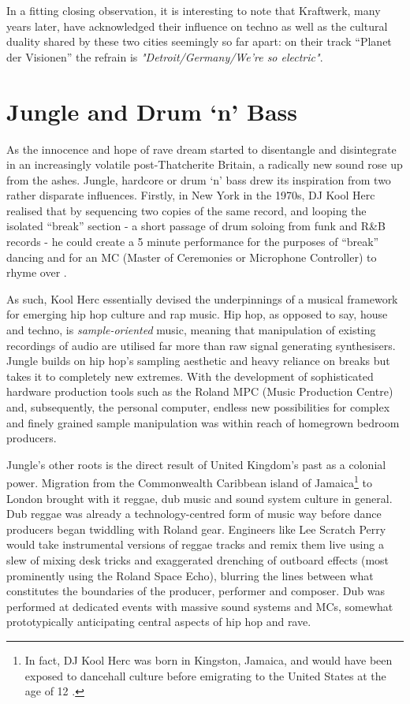 In a fitting closing observation, it is interesting to note that Kraftwerk, many years later, have acknowledged their influence on techno as well as the cultural duality shared by these two cities seemingly so far apart: on their track “Planet der Visionen” the refrain is \textit{"Detroit/Germany/We're so electric"}.

\section{Jungle and Drum ‘n’ Bass}

As the innocence and hope of rave dream started to disentangle and disintegrate in an increasingly volatile post-Thatcherite Britain, a radically new sound rose up from the ashes. Jungle, hardcore or drum ‘n’ bass drew its inspiration from two rather disparate influences. Firstly, in New York in the 1970s, DJ Kool Herc realised that by sequencing two copies of the same record, and looping the isolated “break” section - a short passage of drum soloing from funk and R\&B records - he could create a 5 minute performance for the purposes of “break” dancing and for an MC (Master of Ceremonies or Microphone Controller) to rhyme over \citep{Smith2000}. 

As such, Kool Herc essentially devised the underpinnings of a musical framework for emerging hip hop culture and rap music. Hip hop, as opposed to say, house and techno, is \textit{sample-oriented} music, meaning that manipulation of existing recordings of audio are utilised far more than raw signal generating synthesisers. Jungle builds on hip hop’s sampling aesthetic and heavy reliance on breaks but takes it to completely new extremes. With the development of sophisticated hardware production tools such as the Roland MPC (Music Production Centre) and, subsequently, the personal computer, endless new possibilities for complex and finely grained sample manipulation was within reach of homegrown bedroom producers.

Jungle’s other roots is the direct result of United Kingdom’s past as a colonial power. Migration from the Commonwealth Caribbean island of Jamaica\footnote{In fact, DJ Kool Herc was born in Kingston, Jamaica, and would have been exposed to dancehall culture before emigrating to the United States at the age of 12 \citep{Chang2007}.} to London brought with it reggae, dub music and sound system culture in general. Dub reggae was already a technology-centred form of music way before dance producers began twiddling with Roland gear. Engineers like Lee Scratch Perry would take instrumental versions of reggae tracks and remix them live using a slew of mixing desk tricks and exaggerated drenching of outboard effects (most prominently using the Roland Space Echo), blurring the lines between what constitutes the boundaries of the producer, performer and composer. Dub was performed at dedicated events with massive sound systems and MCs, somewhat prototypically anticipating central aspects of hip hop and rave. 

